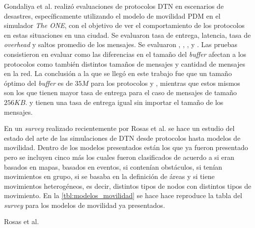 Gondaliya et al. \cite{Gondaliya2015} realizó evaluaciones de protocolos DTN en
escenarios de desastres, específicamente utilizando el modelo de movilidad PDM
en el simulador \textit{The ONE}, con el objetivo de ver el comportamiento de los
protocolos en estas situaciones en una ciudad. Se evaluaron tasa de entrega,
latencia, tasa de \textit{overhead} y saltos promedio de los mensajes. Se
evaluaron \epidemic, \prophet, \ebr, \syf{} y \syw. Las pruebas consistieron en
evaluar como las diferencias en el tamaño del \textit{buffer} afectan a los
protocolos como también distintos tamaños de mensajes y cantidad de mensajes en
la red. La conclusión a la que se llegó en este trabajo fue que un tamaño óptimo
del \textit{buffer} es de $35M$ para los protocolos \epidemic{} y \prophet,
mientras que estos mismos son los que tienen mayor tasa de entrega para el caso
de mensajes de tamaño $256KB$. \syw{} y \ebr{} tienen una tasa de entrega igual
sin importar el tamaño de los mensajes.


En un \textit{survey} realizado recientemente por Rosas et al. \cite{survey} se
hace un estudio del estado del arte de las simulaciones de DTN desde protocolos
hasta modelos de movilidad. Dentro de los modelos presentados están los que ya
fueron presentado pero se incluyen cinco más los cuales fueron clasificados de
acuerdo a si eran basados en mapas, basados en eventos, si contenían obstáculos,
si tenían movimientos en grupo, si se basaba en la definición de áreas y si
tiene movimientos heterogéneos, es decir, distintos tipos de nodos con
distintos tipos de movimiento. En la \ref{tbl:modelos_movilidad} se hace hace
reproduce la tabla del \textit{survey} para los modelos de movilidad ya
presentados.


{Rosas et al. \cite{survey}}








